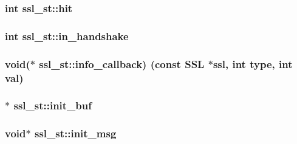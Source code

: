 \subsubsection[{\texorpdfstring{hit}{hit}}]{\setlength{\rightskip}{0pt plus 5cm}int ssl\+\_\+st\+::hit}\hypertarget{structssl__st_a20d2f2c7a00b1fd70c28c81c2d6f34c2}{}\label{structssl__st_a20d2f2c7a00b1fd70c28c81c2d6f34c2}
\subsubsection[{\texorpdfstring{in\+\_\+handshake}{in_handshake}}]{\setlength{\rightskip}{0pt plus 5cm}int ssl\+\_\+st\+::in\+\_\+handshake}\hypertarget{structssl__st_afc46f99873655d3532930b3f0abb3f98}{}\label{structssl__st_afc46f99873655d3532930b3f0abb3f98}
\subsubsection[{\texorpdfstring{info\+\_\+callback}{info_callback}}]{\setlength{\rightskip}{0pt plus 5cm}void($\ast$ ssl\+\_\+st\+::info\+\_\+callback) (const {\bf S\+SL} $\ast$ssl, int {\bf type}, int val)}\hypertarget{structssl__st_aaf32f29b307cfa33c4a19a7cf11bc36f}{}\label{structssl__st_aaf32f29b307cfa33c4a19a7cf11bc36f}
\subsubsection[{\texorpdfstring{init\+\_\+buf}{init_buf}}]{$\ast$ ssl\+\_\+st\+::init\+\_\+buf}\hypertarget{structssl__st_ae79d4878386098526f000f857b38854f}{}\label{structssl__st_ae79d4878386098526f000f857b38854f}
\subsubsection[{\texorpdfstring{init\+\_\+msg}{init_msg}}]{\setlength{\rightskip}{0pt plus 5cm}void$\ast$ ssl\+\_\+st\+::init\+\_\+msg}\hypertarget{structssl__st_a0d932f5ec1630a3cbd511548c3556a45}{}\label{structssl__st_a0d932f5ec1630a3cbd511548c3556a45}
